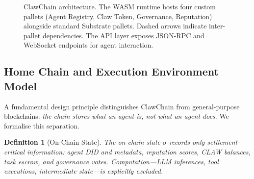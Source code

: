 \documentclass[conference]{IEEEtran}
\newtheorem{definition}{Definition}
\begin{document}
\begin{figure}[t]
\caption{ClawChain architecture. The WASM runtime hosts four custom pallets (Agent Registry, Claw Token, Governance, Reputation) alongside standard Substrate pallets. Dashed arrows indicate inter-pallet dependencies. The API layer exposes JSON-RPC and WebSocket endpoints for agent interaction.}
\label{fig:architecture}
\end{figure}

\subsection{Home Chain and Execution Environment Model}\label{sec:homechain}

A fundamental design principle distinguishes ClawChain from general-purpose blockchains: \textit{the chain stores what an agent is, not what an agent does}. We formalise this separation.

\begin{definition}[On-Chain State]
The on-chain state $\sigma$ records only \emph{settlement-critical} information: agent DID and metadata, reputation scores, CLAW balances, task escrow, and governance votes. Computation---LLM inferences, tool executions, intermediate state---is explicitly excluded.
\end{definition}
\end{document}
